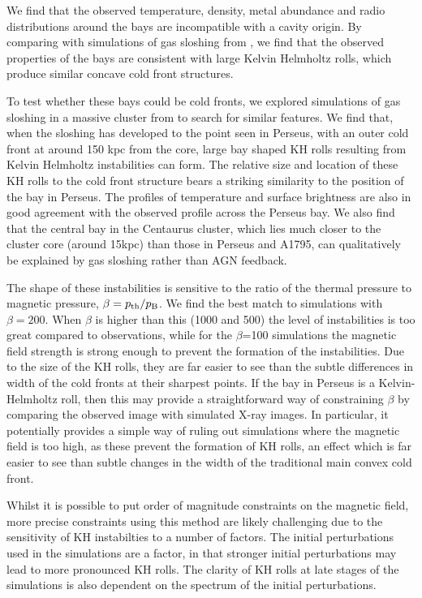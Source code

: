 \documentclass[useAMS,usenatbib]{mn2e}
\begin{document}
We find that the observed temperature, density, metal abundance and radio distributions around the bays are incompatible with a cavity origin. By comparing with simulations
of gas sloshing from \citet{ZuHone2016}, we find that the observed properties of the bays are consistent with large Kelvin Helmholtz rolls, which produce similar concave cold front structures. 

To test whether these bays could be cold fronts, we explored simulations of gas
sloshing in a massive cluster from \citet{ZuHone2016} to search for similar
features. We find that, when the sloshing has developed to the point seen in
Perseus, with an outer cold front at around 150 kpc from the core, large bay
shaped KH rolls resulting from Kelvin Helmholtz instabilities can form. The
relative size and location of these KH rolls to the cold front structure bears a
striking similarity to the position of the bay in Perseus. The profiles of
temperature and surface brightness are also in good agreement with the observed
profile across the Perseus bay. We also find that the central bay in the Centaurus cluster, which lies much closer to the cluster core (around 15kpc) than those in Perseus and A1795, can qualitatively be explained 
by gas sloshing rather than AGN feedback. 

The shape of these instabilities is sensitive to the ratio of the
thermal pressure to magnetic pressure, $\beta= p_{\rm th} / p_{\rm B}$. We find
the best match to simulations with $\beta=200$. When $\beta$ is higher than this
(1000 and 500) the level of instabilities is too great compared to observations,
while for the $\beta$=100 simulations the magnetic field strength is strong
enough to prevent the formation of the instabilities. Due to the size of the
KH rolls, they are far easier to see than the subtle differences in width of the
cold fronts at their sharpest points. If the bay in Perseus is a Kelvin-Helmholtz roll, then
this may provide a straightforward way of constraining $\beta$ by comparing the
observed image with simulated X-ray images. In particular, it potentially provides a simple way of ruling out simulations where the magnetic field is too high, as these
prevent the formation of KH rolls, an effect which is far easier to see than subtle changes in the width of the traditional main convex cold front. 


Whilst it is possible to put order of magnitude constraints on the magnetic field, more precise constraints using this method are likely challenging due to the sensitivity of KH instabilties to a number of factors. The initial 
perturbations used in the simulations are a factor, in that stronger initial perturbations may lead to more pronounced KH rolls. The clarity of KH rolls at late stages of the simulations is also dependent on the spectrum 
of the initial perturbations. 
\end{document}
